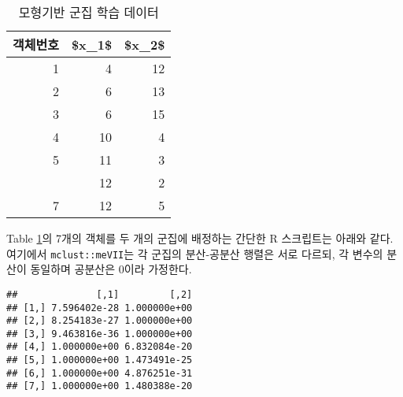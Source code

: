 \documentclass[
]{book}
\newenvironment{Shaded}{\begin{snugshade}}{\end{snugshade}}
\newcommand{\AttributeTok}[1]{\textcolor[rgb]{0.77,0.63,0.00}{#1}}
\newcommand{\CommentTok}[1]{\textcolor[rgb]{0.56,0.35,0.01}{\textit{#1}}}
\newcommand{\DecValTok}[1]{\textcolor[rgb]{0.00,0.00,0.81}{#1}}
\newcommand{\FunctionTok}[1]{\textcolor[rgb]{0.00,0.00,0.00}{#1}}
\newcommand{\NormalTok}[1]{#1}
\newcommand{\OtherTok}[1]{\textcolor[rgb]{0.56,0.35,0.01}{#1}}
\newcommand{\SpecialCharTok}[1]{\textcolor[rgb]{0.00,0.00,0.00}{#1}}
\newcommand{\StringTok}[1]{\textcolor[rgb]{0.31,0.60,0.02}{#1}}
\begin{document}
\begin{table}

\caption{\label{tab:model-based-clustering-data}모형기반 군집 학습 데이터}
\centering
\begin{tabular}[t]{rrr}
\toprule
객체번호 & \$x\_1\$ & \$x\_2\$\\
\midrule
1 & 4 & 12\\
2 & 6 & 13\\
3 & 6 & 15\\
4 & 10 & 4\\
5 & 11 & 3\\
\addlinespace
6 & 12 & 2\\
7 & 12 & 5\\
\bottomrule
\end{tabular}
\end{table}

Table \ref{tab:model-based-clustering-data}의 7개의 객체를 두 개의 군집에 배정하는 간단한 R 스크립트는 아래와 같다. 여기에서 \texttt{mclust::meVII}는 각 군집의 분산-공분산 행렬은 서로 다르되, 각 변수의 분산이 동일하며 공분산은 0이라 가정한다.

\begin{Shaded}
\end{Shaded}

\begin{verbatim}
##              [,1]         [,2]
## [1,] 7.596402e-28 1.000000e+00
## [2,] 8.254183e-27 1.000000e+00
## [3,] 9.463816e-36 1.000000e+00
## [4,] 1.000000e+00 6.832084e-20
## [5,] 1.000000e+00 1.473491e-25
## [6,] 1.000000e+00 4.876251e-31
## [7,] 1.000000e+00 1.480388e-20
\end{verbatim}
\end{document}
